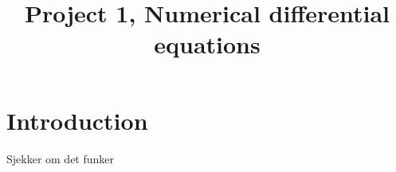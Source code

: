 
\title{Project 1, Numerical differential equations}
\maketitle

\section{Introduction}
Sjekker om det funker
